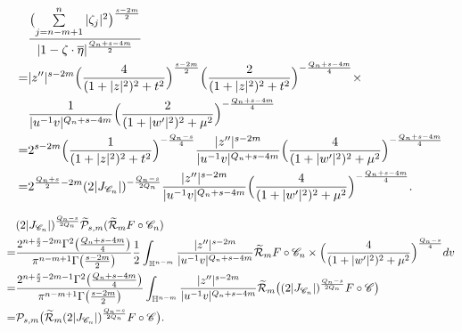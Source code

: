 \documentclass[10pt,a4paper]{amsart}
\begin{document}
\begin{align}\nonumber
&\frac{\bigl(\sum\limits_{j=n-m+1}^{n}|\zeta_{j}|^{2}\bigr)^{\frac{s-2m}{2}}}
{|1-\zeta\cdot\overline{\eta}|^{\frac{Q_n+s-4m}{2}}}\\
\nonumber
=& |z''|^{s-2m}
\Bigl(\frac{4}{(1+|z|^{2})^{2}+t^2}\Bigr)^{\frac{s-2m}{2}}
\Bigl(\frac{2}{(1+|z|^{2})^{2}+t^2}\Bigr)^{-\frac{Q_n+s-4m}{4}}\times\\
\nonumber
&
\frac{1}{|u^{-1}v|^{Q_n+s-4m}}
\Bigl(\frac{2}{(1+|w'|^{2})^{2}+\mu^2}\Bigr)^{-\frac{Q_n+s-4m}{4}}\\
\nonumber
=& 2^{s-2m}
\Bigl(\frac{1}{(1+|z|^{2})^{2}+t^2}\Bigr)^{-\frac{Q_n-s}{4}}
\frac{|z''|^{s-2m}}{|u^{-1}v|^{Q_n+s-4m}}
\Bigl(\frac{4}{(1+|w'|^{2})^{2}+\mu^2}\Bigr)^{-\frac{Q_n+s-4m}{4}}\\
\label{b3.1}
=& 2^{\frac{Q_n+s}{2}-2m}
(2|J_{\mathscr{C}_n}|)^{-\frac{Q_n-s}{2Q_n}}
\frac{|z''|^{s-2m}}{|u^{-1}v|^{Q_n+s-4m}}
\Bigl(\frac{4}{(1+|w'|^{2})^{2}+\mu^2}\Bigr)^{-\frac{Q_n+s-4m}{4}}.
\end{align}

\begin{align}\nonumber
&(2|J_{\mathscr{C}_n}|)^{\frac{Q_n-s}{2Q_n}}
\widetilde{\mathcal{P}}_{s,m}(\widetilde{\mathcal{R}}_{m}F\circ\mathscr{C}_{n})\\
\nonumber
=& \frac{2^{n+\frac{s}{2}-2m}\Gamma^{2}\bigl(\frac{Q_n+s-4m}{4}\bigr)}
{\pi^{n-m+1}\Gamma\bigl(\frac{s-2m}{2}\bigr)}
\frac{1}{2}\int_{\mathbb{H}^{n-m}}
\frac{|z''|^{s-2m}}{|u^{-1}v|^{Q_n+s-4m}}
\widetilde{\mathcal{R}}_{m}F\circ\mathscr{C}_{n}\times
\Bigl(\frac{4}{(1+|w'|^{2})^{2}+\mu^2}\Bigr)^{\frac{Q_n-s}{4}} dv\\
\nonumber
=& \frac{2^{n+\frac{s}{2}-2m-1}\Gamma^{2}\bigl(\frac{Q_n+s-4m}{4}\bigr)}
{\pi^{n-m+1}\Gamma\bigl(\frac{s-2m}{2}\bigr)}
\int_{\mathbb{H}^{n-m}}
\frac{|z''|^{s-2m}}{|u^{-1}v|^{Q_n+s-4m}}
\widetilde{\mathcal{R}}_{m}\bigl((2|J_{\mathscr{C}_n}|)^{\frac{Q_n-s}{2Q_n}}F\circ\mathscr{C}\bigr)\\
\label{3.10}
=& \mathcal{P}_{s,m}\bigl(\widetilde{\mathcal{R}}_{m}(2|J_{\mathscr{C}_n}|)^{\frac{Q_n-s}{2Q_n}}F\circ\mathscr{C}\bigr).
\end{align}
\end{document}
